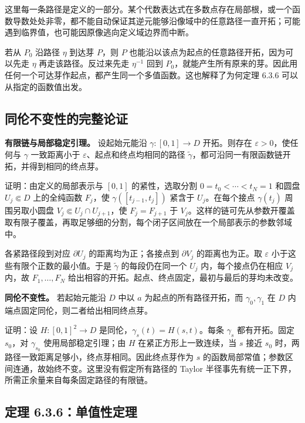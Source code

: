\documentclass[11pt,a4paper]{article}
\begin{document}
这里每一条路径是定义的一部分。某个代数表达式在多数点存在局部根，或一个函数导数处处非零，都不能自动保证其逆元能够沿像域中的任意路径一直开拓；可能遇到临界值，也可能因原像逃向定义域边界而中断。

若从 \(P_0\) 沿路径 \(\eta\) 到达芽 \(P\)，则 \(P\)
也能沿以该点为起点的任意路径开拓，因为可以先走 \(\eta\)
再走该路径。反过来先走 \(\eta^{-1}\) 回到
\(P_0\)，就能产生所有原来的芽。因此用任何一个可达芽作起点，都产生同一个多值函数。这也解释了为何定理
6.3.6 可以从指定的函数值出发。

\subsection{同伦不变性的完整论证}\label{ch06-s3-heading-6}

\textbf{有限链与局部稳定引理。} 设起始元能沿 \(\gamma:[0,1]\to D\)
开拓。则存在 \(\varepsilon>0\)，使任何与 \(\gamma\) 一致距离小于
\(\varepsilon\)、起点和终点均相同的路径
\(\widetilde\gamma\)，都可沿同一有限函数链开拓，并得到相同的终点芽。

证明：由定义的局部表示与 \([0,1]\) 的紧性，选取分割
\(0=t_0<\cdots<t_N=1\) 和圆盘 \(U_j\Subset D\) 上的全纯函数 \(F_j\)，使
\(\gamma([t_{j-1},t_j])\) 紧含于 \(U_j\)。在每个接点 \(\gamma(t_j)\)
周围另取小圆盘 \(V_j\Subset U_j\cap U_{j+1}\)，使 \(F_j=F_{j+1}\) 于
\(V_j\)。这样的链可先从参数开覆盖取有限子覆盖，再取足够细的分割，每个闭子区间放在一个局部表示的参数邻域中。

各紧路径段到对应 \(\partial U_j\) 的距离均为正；各接点到
\(\partial V_j\) 的距离也为正。取 \(\varepsilon\)
小于这些有限个正数的最小值。于是 \(\widetilde\gamma\) 的每段仍在同一个
\(U_j\) 内，每个接点仍在相应 \(V_j\) 内，故 \(F_1,\ldots,F_N\)
给出相容的开拓。起点、终点固定，最初与最后的芽均未改变。

\textbf{同伦不变性。} 若起始元能沿 \(D\) 中以 \(a\)
为起点的所有路径开拓，而 \(\gamma_0,\gamma_1\) 在 \(D\)
内端点固定同伦，则二者给出相同终点芽。

证明：设 \(H:[0,1]^2\to D\) 是同伦，\(\gamma_s(t)=H(s,t)\)。每条
\(\gamma_s\) 都有开拓。固定 \(s_0\)，对 \(\gamma_{s_0}\)
使用局部稳定引理；由 \(H\) 在紧正方形上一致连续，当 \(s\) 接近 \(s_0\)
时，两路径一致距离足够小，终点芽相同。因此终点芽作为 \(s\)
的函数局部常值；参数区间连通，故始终不变。这里没有假定所有路径的 Taylor
半径事先有统一正下界，所需正余量来自每条固定路径的有限链。

\subsection{定理 6.3.6：单值性定理}\label{ch06-s3-heading-7}
\end{document}
